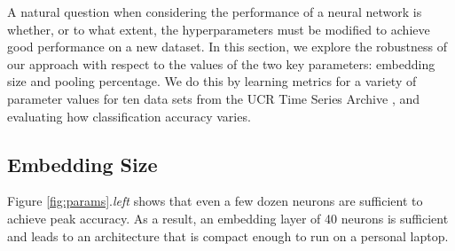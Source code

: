 
A natural question when considering the performance of a neural network is whether, or to what extent, the hyperparameters must be modified to achieve good performance on a new dataset. In this section, we explore the robustness of our approach with respect to the values of the two key parameters: embedding size and pooling percentage. We do this by learning metrics for a variety of parameter values for ten data sets from the UCR Time Series Archive \citep{ucrArchive}, and evaluating how classification accuracy varies.




\subsection{Embedding Size}

Figure \ref{fig:params}.\textit{left} shows that even a few dozen neurons are sufficient to achieve peak accuracy. As a result, an embedding layer of 40 neurons is sufficient and leads to an architecture that is compact enough to run on a personal laptop.


